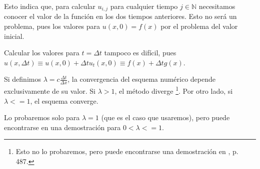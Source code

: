 Esto indica que, para calcular $u_{i,j}$ para cualquier tiempo $j\in\mathbb{N}$ necesitamos conocer el valor de la función en los dos tiempos anteriores. Esto no será un problema, pues los valores para $u(x,0) = f(x)$ por el problema del valor inicial.

Calcular los valores para $t=\Delta t$ tampoco es difícil, pues $u(x,\Delta t) \equiv u(x,0) + \Delta t u_t(x,0) \equiv f(x) +\Delta tg(x)$.

Si definimos $\lambda = c\frac{\Delta t}{\Delta x}$, la convergencia del esquema numérico depende exclusivamente de su valor. Si $\lambda > 1$, el método diverge \footnote{Esto no lo probaremos, pero puede encontrarse una demostración en \citet{anummeth}, p. 487.}. Por otro lado, si $\lambda <=1$, el esquema converge.

Lo probaremos solo para $\lambda=1$ (que es el caso que usaremos), pero puede encontrarse en \citet{anummeth} una demostración para $0<\lambda<=1$.

